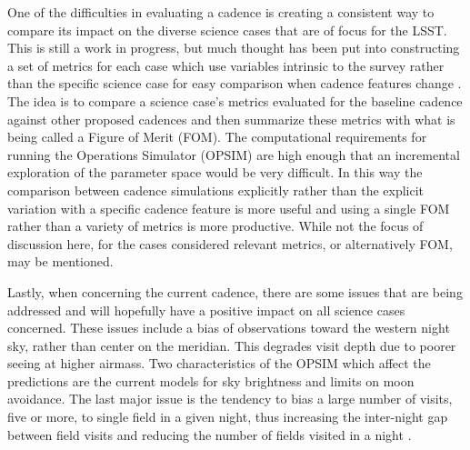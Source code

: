 \documentclass[12pt]{article}
\begin{document}
One of the difficulties in evaluating a cadence is creating a consistent way to compare its impact on the diverse science cases that are of focus for the LSST. This is still a work in progress, but much thought has been put into constructing a set of metrics for each case which use variables intrinsic to the survey rather than the specific science case for easy comparison when cadence features change \citep{LSSTScienceCollaboration2017}. The idea is to compare a science case's metrics evaluated for the baseline cadence against other proposed cadences and then summarize these metrics with what is being called a Figure of Merit (FOM). The computational requirements for running the Operations Simulator (OPSIM) are high enough that an incremental exploration of the parameter space would be very difficult. In this way the comparison between cadence simulations explicitly rather than the explicit variation with a specific cadence feature is more useful and using a single FOM rather than a variety of metrics is more productive. While not the focus of discussion here, for the cases considered relevant metrics, or alternatively FOM, may be mentioned. \par
Lastly, when concerning the current cadence, there are some issues that are being addressed and will hopefully have a positive impact on all science cases concerned. These issues include a bias of observations toward the western night sky, rather than center on the meridian. This degrades visit depth due to poorer seeing at higher airmass. Two characteristics of the OPSIM which affect the predictions are the current models for sky brightness and limits on moon avoidance. The last major issue is the tendency to bias a large number of visits, five or more, to single field in a given night, thus increasing the inter-night gap between field visits and reducing the number of fields visited in a night \citep{LSSTScienceCollaboration2017}.  \par
\end{document}
